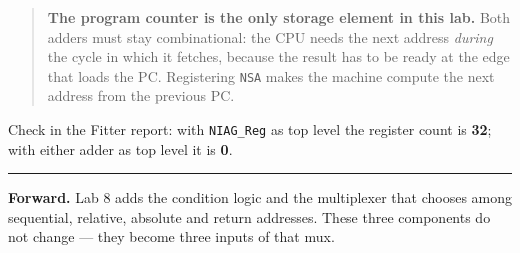 \documentclass[11pt]{article}
\newcommand{\code}[1]{\texttt{#1}}
\newcommand{\hr}{\vspace{2pt}\hrule\vspace{6pt}}
\begin{document}
\begin{quote}
\textbf{The program counter is the only storage element in this lab.} Both adders
must stay combinational: the CPU needs the next address \emph{during} the cycle in
which it fetches, because the result has to be ready at the edge that loads the
PC. Registering \code{NSA} makes the machine compute the next address from the
previous PC.
\end{quote}

Check in the Fitter report: with \code{NIAG\_Reg} as top level the register count
is \textbf{32}; with either adder as top level it is \textbf{0}.

\vspace{6pt}
\hr
{\small \textbf{Forward.} Lab 8 adds the condition logic and the multiplexer that
chooses among sequential, relative, absolute and return addresses. These three
components do not change --- they become three inputs of that mux.}
\end{document}
